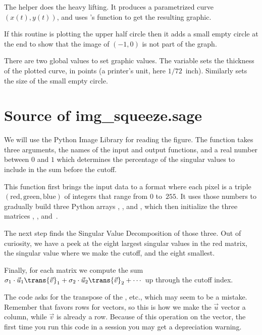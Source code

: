 The helper does the heavy lifting.
It produces a parametrized curve $(x(t),y(t))$, and uses \Sage's
 function to get the resulting graphic.

If this routine is plotting the upper half circle then it adds a
small empty circle at the end to show that the image of $(-1,0)$
is not part of the graph.

There are two global values to set graphic values.
The variable  sets the thickness of 
the plotted curve, in points (a printer's unit, here $1/72$~inch).
Similarly  sets the size of the small empty circle.



\section{Source of img\_squeeze.sage}
We will use the Python Image Library for reading the figure.
The function
takes three arguments, the names of the input and output functions, and
a real number between $0$ and $1$ which determines the percentage 
of the singular values to include in the sum before the cutoff.

This function first brings the input data to a format where each
pixel is a triple 
$(\text{red}, \text{green},\text{blue})$ of integers that range from 
$0$ to~$255$.
It uses those numbers to gradually build 
three Python arrays , ,
and , which then initialize the 
three \Sage{} matrices ,
, and~.


The next step finds the Singular Value Decomposition of those three.
Out of curiosity, we have a peek at the eight largest singular
values in the red matrix, the singular value where we make the cutoff,
and the eight smallest.


Finally, for each matrix we compute the sum
$\sigma_1\cdot\vec{u}_1\trans{\vec{v}}_1+\sigma_2\cdot\vec{u}_2\trans{\vec{v}}_2
   +\cdots$
up through the cutoff index.

The code asks for the transpose of the
\protect{}, etc., which may seem to be a mistake.
Remember that \protect\Sage{} favors rows for vectors, so this is how we
make the $\vec{u}$ vector a column, while $\vec{v}$ is already a row.
Because of this operation on the vector, the first time you run this
code in a \protect\Sage{} session you may get a depreciation warning.

